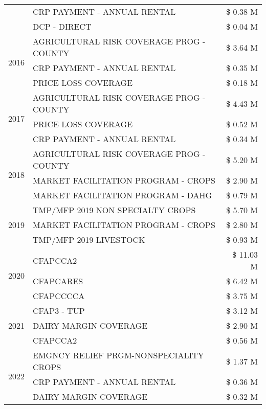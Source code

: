\begin{tabular}{llr}
 & CRP PAYMENT - ANNUAL RENTAL & \$ 0.38 M \\
 & DCP - DIRECT & \$ 0.04 M \\
\cline{1-3}
\multirow[t]{3}{*}{2016} & AGRICULTURAL RISK COVERAGE PROG - COUNTY & \$ 3.64 M \\
 & CRP PAYMENT - ANNUAL RENTAL & \$ 0.35 M \\
 & PRICE LOSS COVERAGE & \$ 0.18 M \\
\cline{1-3}
\multirow[t]{3}{*}{2017} & AGRICULTURAL RISK COVERAGE PROG - COUNTY & \$ 4.43 M \\
 & PRICE LOSS COVERAGE & \$ 0.52 M \\
 & CRP PAYMENT - ANNUAL RENTAL & \$ 0.34 M \\
\cline{1-3}
\multirow[t]{3}{*}{2018} & AGRICULTURAL RISK COVERAGE PROG - COUNTY & \$ 5.20 M \\
 & MARKET FACILITATION PROGRAM - CROPS & \$ 2.90 M \\
 & MARKET FACILITATION PROGRAM - DAHG & \$ 0.79 M \\
\cline{1-3}
\multirow[t]{3}{*}{2019} & TMP/MFP 2019 NON SPECIALTY CROPS & \$ 5.70 M \\
 & MARKET FACILITATION PROGRAM - CROPS & \$ 2.80 M \\
 & TMP/MFP 2019 LIVESTOCK & \$ 0.93 M \\
\cline{1-3}
\multirow[t]{3}{*}{2020} & CFAPCCA2 & \$ 11.03 M \\
 & CFAPCARES & \$ 6.42 M \\
 & CFAPCCCCA & \$ 3.75 M \\
\cline{1-3}
\multirow[t]{3}{*}{2021} & CFAP3 - TUP & \$ 3.12 M \\
 & DAIRY MARGIN COVERAGE & \$ 2.90 M \\
 & CFAPCCA2 & \$ 0.56 M \\
\cline{1-3}
\multirow[t]{3}{*}{2022} & EMGNCY RELIEF PRGM-NONSPECIALITY CROPS & \$ 1.37 M \\
 & CRP PAYMENT - ANNUAL RENTAL & \$ 0.36 M \\
 & DAIRY MARGIN COVERAGE & \$ 0.32 M \\
\cline{1-3}
\bottomrule
\end{tabular}
